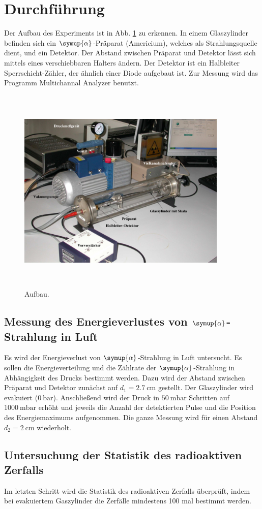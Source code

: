 \section{Durchführung}
\label{sec:Durchführung}

Der Aufbau des Experiments ist in Abb. \ref{fig:aufbau} zu erkennen. In einem Glaszylinder befinden sich ein $\symup{\alpha}$-Präparat (Americium), welches als Strahlungsquelle dient, und ein Detektor. Der Abstand zwischen Präparat und Detektor lässt sich mittels eines verschiebbaren Halters ändern. Der Detektor ist ein Halbleiter Sperrschicht-Zähler, der ähnlich einer Diode aufgebaut ist. 
Zur Messung wird das Programm Multichannal Analyzer benutzt. 

\begin{figure}
    \centering
    \includegraphics[width=10cm, height=10cm]{build/aufbau.png}
    \caption{Aufbau. \cite{V701}}
    \label{fig:aufbau}
\end{figure}

\subsection{Messung des Energieverlustes von $\symup{\alpha}$-Strahlung in Luft}
Es wird der Energieverlust von $\symup{\alpha}$-Strahlung in Luft untersucht.
Es sollen die Energieverteilung und die Zählrate der $\symup{\alpha}$-Strahlung in Abhängigkeit des Drucks bestimmt werden.
\newline
Dazu wird der Abstand zwischen Präparat und Detektor zunächst auf $d_1 = \SI{2.7}{\centi\meter}$ gestellt. Der Glaszylinder wird evakuiert ($\SI{0}{\bar}$). Anschließend wird der Druck in $\SI{50}{\milli\bar}$ Schritten auf $\SI{1000}{\milli\bar}$ erhöht und jeweils die Anzahl der detektierten Pulse und die Position des Energiemaximums aufgenommen.
\newline
Die ganze Messung wird für einen Abstand $d_2 = \SI{2}{\centi\meter}$ wiederholt.

\subsection{Untersuchung der Statistik des radioaktiven Zerfalls}
Im letzten Schritt wird die Statistik des radioaktiven Zerfalls überprüft, indem bei evakuiertem Gaszylinder die Zerfälle mindestens 100 mal bestimmt werden. 